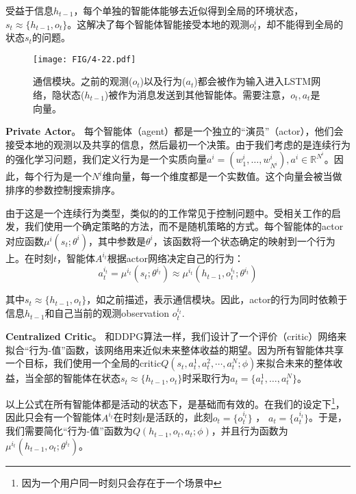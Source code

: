 受益于信息$h_{t-1}$，每个单独的智能体能够去近似得到全局的环境状态，$s_t \approx \{h_{t-1}, o_t\}$。这解决了每个智能体智能接受本地的观测$o^i_t$，却不能得到全局的状态$s_t$的问题。

\begin{figure}[t]
 \centering
  \texttt{[image: FIG/4-22.pdf]}
  \caption{通信模块。之前的观测($o_t$)以及行为($a_t$)都会被作为输入进入LSTM网络，隐状态($h_{t-1}$)被作为消息发送到其他智能体。需要注意，$o_t,a_t$是向量。}
  \label{fig:message}
 \end{figure}
 
\textbf{Private Actor}。
每个智能体（agent）都是一个独立的“演员”（actor），他们会接受本地的观测以及共享的信息，然后最初一个决策。由于我们考虑的是连续行为的强化学习问题，我们定义行为是一个实质向量$a^i = (w^i_1, \dots, w^i_{N^i}), a^i \in \mathbb{R}^{N^i}$。因此，每个行为是一个$N^i$维向量，每一个维度都是一个实数值。这个向量会被当做排序的参数控制搜索排序。

由于这是一个连续行为类型，类似的的工作常见于控制问题中。受相关工作的启发，我们使用一个确定策略的方法，而不是随机策略的方式。每个智能体的actor对应函数$\mu^i(s_t;\theta^i)$，其中参数是$\theta^i$，该函数将一个状态确定的映射到一个行为上。在时刻$t$，智能体$A^{i_t}$根据actor网络决定自己的行为：
\begin{equation}
a_t^{i_t} = \mu^{i_t}(s_t;\theta^{i_t}) \approx \mu^{i_t}(h_{t-1}, o^{i_t}_t;\theta^{i_t})
\end{equation}

其中$s_t\approx\{h_{t-1},o_t\}$，如之前描述，表示通信模块。因此，actor的行为同时依赖于信息$h_{t-1}$和自己当前的观测observation $o^{i_t}_t$. 

\textbf{Centralized Critic}。
和DDPG算法一样，我们设计了一个评价（critic）网络来拟合“行为-值”函数，该网络用来近似未来整体收益的期望。因为所有智能体共享一个目标，我们使用一个全局的critic$Q(s_t, a^1_t, a^2_t, \cdots, a^N_t;\phi)$来拟合未来的整体收益，当全部的智能体在状态$s_t \approx \{h_{t-1}, o_t\}$时采取行为$a_t = \{a_t^1, \dots, a_t^N \}$。

以上公式在所有智能体都是活动的状态下，是基础而有效的。在我们的设定下\footnote{因为一个用户同一时刻只会存在于一个场景中}，因此只会有一个智能体$A^{i_t}$在时刻$t$是活跃的，此刻$o_t = \{o_t^{i_t}\}$ ， $a_t = \{a_t^{i_t}\}$。于是，我们需要简化“行为-值”函数为$Q(h_{t-1}, o_t, a_t;\phi)$，并且行为函数为$\mu^{i_t}(h_{t-1}, o_t; \theta^{i_t})$。

